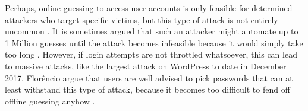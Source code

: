 Perhaps, online guessing to access user accounts is only feasible for determined attackers who target specific victims, but this type of attack is not entirely uncommon \cite{Florencio2013WhereDoAllTheAttacksGo, Florencio2014PasswordPortfoliosFiniteUser, Herley2015Counterfactuals, Wang2016TargetedGuessingUnderestimated}. It is sometimes argued that such an attacker might automate up to 1 Million guesses until the attack becomes infeasible because it would simply take too long \cite{Bonneau2015ImperfectAuthentication, Florencio2014AdministratorsGuide}. However, if login attempts are not throttled whatsoever, this can lead to massive attacks, like the largest attack on WordPress to date in December 2017. 
Florêncio \etal argue that users are well advised to pick passwords that can at least withstand this type of attack, because it becomes too difficult to fend off offline guessing anyhow \cite{Florencio2014AdministratorsGuide, Florencio2014PasswordPortfoliosFiniteUser, Florencio2016CommACM}. 


